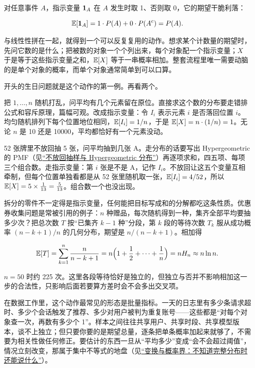 对任意事件 \(A\)，指示变量 \(\mathbf{1}_A\) 在 \(A\) 发生时取 1、否则取 0，它的期望干脆利落：

\[
\mathbb{E}[\mathbf{1}_A]=1\cdot P(A)+0\cdot P(A^c)=P(A).
\]

与线性性拼在一起，就得到一个可以反复复用的动作。想求某个计数量的期望时，先问它数的是什么；把被数的对象一个个列出来，每个对象配一个指示变量；\(X\) 于是等于这些指示变量之和，\(\mathbb{E}[X]\) 等于一串概率相加。整套流程里唯一需要动脑的是单个对象的概率，而单个对象通常简单到可以口算。

开头的生日问题就是这个动作的第一例。再看两个。

\begin{example}[随机排列的不动点]
把 \(1,\ldots,n\) 随机打乱，问平均有几个元素留在原位。直接求这个数的分布要走错排公式和容斥原理，篇幅可观。改成指示变量：令 \(I_i\) 表示元素 \(i\) 是否落回位置 \(i\)。均匀随机排列下每个位置地位相同，\(\mathbb{E}[I_i]=1/n\)，于是 \(\mathbb{E}[X]=n\cdot(1/n)=1\)。无论 \(n\) 是 10 还是 10000，平均都恰好有一个元素没动。
\end{example}

\begin{example}[不放回抽牌]
52 张牌里不放回抽 5 张，问平均抽到几张 A。走分布的话要写出 Hypergeometric 的 PMF（见\hyperref[sec:05-Probability/06-Common-Distributions/02]{``不放回抽样与 Hypergeometric 分布''}）再逐项求和，四五项、每项三个组合数。走指示变量：第 \(i\) 张是不是 A，记作 \(I_i\)。不放回让这五个变量互相牵制，但每个位置单独看都是从 52 张里随机取一张，\(\mathbb{E}[I_i]=4/52\)，所以 \(\mathbb{E}[X]=5\times\frac1{13}=\frac5{13}\)。组合数一个也没出现。
\end{example}

拆分的零件不一定得是指示变量，任何能把目标写成和的分解都吃这条性质。优惠券收集问题是常被引用的例子：\(n\) 种赠品，每次随机得到一种，集齐全部平均要抽多少次？把总次数 \(T\) 按``已集齐 \(k-1\) 种''分段，第 \(k\) 段的等待次数 \(T_k\) 服从成功概率 \((n-k+1)/n\) 的几何分布，期望是 \(n/(n-k+1)\)。相加得

\[
\mathbb{E}[T]=\sum_{k=1}^{n}\frac{n}{n-k+1}=n\Bigl(1+\frac12+\cdots+\frac1n\Bigr)=nH_n\approx n\ln n.
\]

\(n=50\) 时约 225 次。这里各段等待恰好是独立的，但独立与否并不影响相加这一步的合法性，只影响后面若要算方差时会不会多出交叉项。

在数据工作里，这个动作最常见的形态是批量指标。一天的日志里有多少条请求超时、多少个会话触发了推荐、多少对用户被判为重复账号——这些都是``对每个对象查一次，再数有多少个 1''。样本之间往往共享用户、共享时段、共享模型版本，谈不上独立；但只要你要的是期望总量，逐条把单条概率加起来就够了，不需要为相关性做任何修正。要估计的东西一旦从``平均多少''变成``会不会超过阈值''，情况立刻改变，那属于集中不等式的地盘（见\hyperref[ch:043]{``变换与概率界：不知道完整分布时还能说什么''}）。

